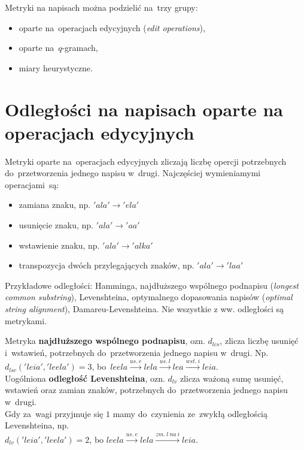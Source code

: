 \documentclass[12pt, twoside, openany]{report}
\theoremstyle{plain}
\begin{document}
Metryki na napisach można podzielić na~trzy grupy:
\begin{itemize}
\item oparte na~operacjach edycyjnych (\emph{edit operations}),
\item oparte na~$q$-gramach,
\item miary heurystyczne.
\end{itemize}


\section{Odległości na napisach oparte na operacjach edycyjnych}

Metryki oparte na~operacjach edycyjnych zliczają liczbę opercji potrzebnych do~przetworzenia jednego napisu w~drugi. Najczęściej wymieniamymi operacjami~są:
\begin{itemize}
\item zamiana znaku, np. $'ala' \rightarrow 'ela'$
\item usunięcie znaku, np. $'ala' \rightarrow 'aa'$
\item wstawienie znaku, np. $'ala' \rightarrow 'alka'$
\item transpozycja dwóch przylegających znaków, np. $'ala' \rightarrow 'laa'$
\end{itemize}

Przykładowe odległości: Hamminga, najdłuższego wspólnego podnapisu (\emph{longest common substring}), Levenshteina, optymalnego dopasowania napisów (\emph{optimal string alignment}), Damareu-Levenshteina. Nie wszystkie z ww. odległości są metrykami.



Metryka \textbf{najdłuższego wspólnego podnapisu}, ozn. $d_{lcs}$, zlicza liczbę usunięć i~wstawień, potrzebnych do~przetworzenia jednego napisu w~drugi. Np. $d_{lsc}('leia', 'leela') = 3$, bo~$leela  \xrightarrow{us.\ e} lela  \xrightarrow{us.\ l} lea  \xrightarrow{wst.\ i} leia$.\\

Uogólniona \textbf{odległość Levenshteina}, ozn. $d_{lv}$ zlicza ważoną sumę usunięć, wstawień oraz zamian znaków, potrzebnych do~przetworzenia jednego napisu w~drugi. \\


Gdy za~wagi przyjmuje się $1$ mamy do~czynienia ze~zwykłą odległością Levenshteina, np. \\
$d_{lv}('leia', 'leela') = 2$, bo $leela  \xrightarrow{us.\ e} lela  \xrightarrow{zm.\ l\ na\ i} leia$. \\
\end{document}
